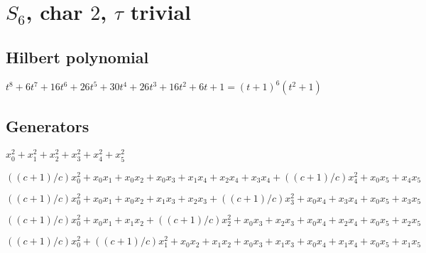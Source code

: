 \documentclass{article}
\numberwithin{equation}{section}
\begin{document}




\section{$S_6$, char $2$, $\tau$ trivial}

\subsection{Hilbert polynomial}

$t^8 + 6t^7 + 16t^6 + 26t^5 + 30t^4 + 26t^3 + 16t^2 + 6t + 1 =(t + 1)^6  (t^2 + 1)$

\subsection{Generators}

$x_0^2 + x_1^2 + x_2^2 + x_3^2 + x_4^2 + x_5^2$

$((c + 1)/c)x_0^2 + x_0x_1 + x_0x_2 + x_0x_3 + x_1x_4 + x_2x_4 +
x_3x_4 + ((c + 1)/c)x_4^2 + x_0x_5 + x_4x_5$

$((c + 1)/c)x_0^2 + x_0x_1 + x_0x_2 + x_1x_3 + x_2x_3 + ((c +
1)/c)x_3^2 + x_0x_4 + x_3x_4 + x_0x_5 + x_3x_5$

$((c + 1)/c)x_0^2 + x_0x_1 + x_1x_2 + ((c + 1)/c)x_2^2 + x_0x_3 +
x_2x_3 + x_0x_4 + x_2x_4 + x_0x_5 + x_2x_5$

$((c + 1)/c)x_0^2 + ((c + 1)/c)x_1^2 + x_0x_2 + x_1x_2 + x_0x_3 +
x_1x_3 + x_0x_4 + x_1x_4 + x_0x_5 + x_1x_5$
\end{document}
